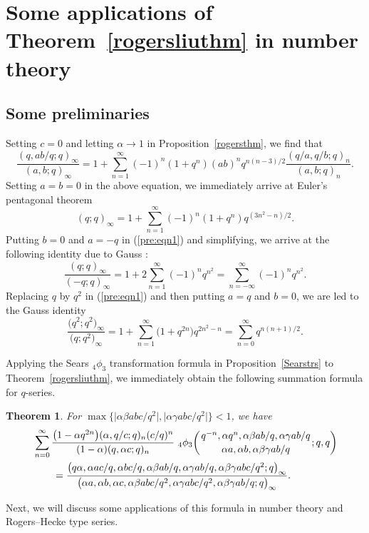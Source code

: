\documentclass[10pt,a4paper]{amsart}
\numberwithin{equation}{section}
\newtheorem{Theorem}{Theorem}[section]
\begin{document}
\section{Some applications of Theorem~\ref{rogersliuthm} in number theory}\label{sec4}
\subsection{Some preliminaries}
Setting $c=0$ and letting $\alpha \to 1$ in Proposition~\ref{rogersthm}, we find that
\begin{equation} \label{pre:eqn1}
	\frac{(q, ab/q; q)_\infty}{(a, b; q)_\infty}
	=1+\sum_{n=1}^\infty (-1)^n (1+q^n) (ab)^n q^{n(n-3)/2} \frac{(q/a, q/b; q)_n}{(a, b; q)_n}.
\end{equation}
Setting $a=b=0$ in the above equation, we immediately arrive at Euler's pentagonal theo\-rem~\mbox{\cite[equation~(15)]{Gas+Rah}}%
\begin{equation*}%
	(q; q)_\infty=1+\sum_{n=1}^\infty (-1)^n (1+q^n) q^{(3n^2-n)/2}.
\end{equation*}
Putting $b=0$ and $a=-q$ in (\ref{pre:eqn1}) and simplifying, we arrive at the following identity due to Gauss \cite[p.~347]{Liu2010pacific}:
\begin{equation}\label{pre:eqn3}
	\frac{(q; q)_\infty}{(-q; q)_\infty}
	=1+2\sum_{n=1}^\infty (-1)^n q^{n^2}
	=\sum_{n=-\infty}^\infty (-1)^n q^{n^2}.
\end{equation}
Replacing $q$ by $q^2$ in (\ref{pre:eqn1}) and then putting $a=q$ and $b=0$, we are led to the Gauss iden\-tity~\mbox{\cite[p.~347]{Liu2010pacific}}
\begin{equation}\label{pre:eqn4}
	\frac{\bigl(q^2; q^2\bigr)_\infty}{\bigl(q; q^2\bigr)_\infty}
	=1+\sum_{n=1}^\infty \bigl(1+q^{2n}\bigr) q^{2n^2-n}
	=\sum_{n=0}^\infty q^{n(n+1)/2}.
\end{equation}

Applying the Sears $_4\phi_3$ transformation formula in Proposition~\ref{Searstrs}
to Theorem~\ref{rogersliuthm}, we immediately obtain the following summation formula for $q$-series.
\begin{Theorem}\label{prodliuthm}
	For $\max\bigl\{\bigl|\alpha \beta abc/q^2\bigr|, \bigl|\alpha \gamma abc/q^2\bigr|\bigr\}<1$, we have
	\begin{align*}
		&\sum_{n=0}^\infty \frac{\bigl(1-\alpha q^{2n}\bigr)(\alpha, q/c; q)_n (c/q)^n}{(1-\alpha)(q, \alpha c; q)_n}~ {_4 \phi_3} \biggl({{q^{-n}, \alpha q^n, \alpha \beta ab/q, \alpha \gamma ab/q}
			\atop{\alpha a, \alpha b,\alpha \beta \gamma ab/q}}; q, q\biggr)\\
		&\qquad{}=\frac{\bigl(q\alpha, \alpha ac/q, \alpha bc/q, \alpha \beta ab/q, \alpha \gamma ab/q, \alpha \beta \gamma abc/q^2; q\bigr)_\infty}
		{\bigl(\alpha a, \alpha b, \alpha c, \alpha \beta abc/q^2, \alpha \gamma abc/q^2, \alpha \beta \gamma ab/q; q \bigr)_\infty}.
	\end{align*}
\end{Theorem}
Next, we will discuss some applications of this formula in number theory and Rogers--Hecke type series.
\end{document}
